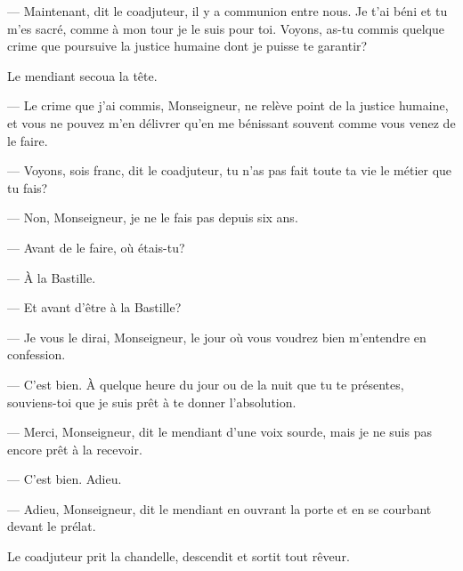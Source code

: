 — Maintenant, dit le coadjuteur, il y a communion entre nous. Je t'ai béni et tu m'es sacré, comme à mon tour je le suis pour toi. Voyons, as-tu commis quelque crime que poursuive la justice humaine dont je puisse te garantir?

Le mendiant secoua la tête.

— Le crime que j'ai commis, Monseigneur, ne relève point de la justice humaine, et vous ne pouvez m'en délivrer qu'en me bénissant souvent comme vous venez de le faire.

— Voyons, sois franc, dit le coadjuteur, tu n'as pas fait toute ta vie le métier que tu fais?

— Non, Monseigneur, je ne le fais pas depuis six ans.

— Avant de le faire, où étais-tu?

— À la Bastille.

— Et avant d'être à la Bastille?

— Je vous le dirai, Monseigneur, le jour où vous voudrez bien m'entendre en confession.

— C'est bien. À quelque heure du jour ou de la nuit que tu te présentes, souviens-toi que je suis prêt à te donner l'absolution.

— Merci, Monseigneur, dit le mendiant d'une voix sourde, mais je ne suis pas encore prêt à la recevoir.

— C'est bien. Adieu.

— Adieu, Monseigneur, dit le mendiant en ouvrant la porte et en se courbant devant le prélat.

Le coadjuteur prit la chandelle, descendit et sortit tout rêveur.